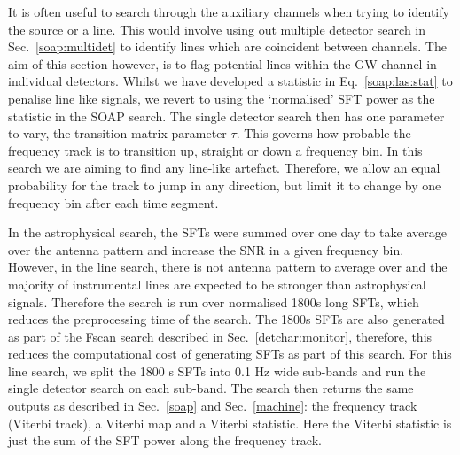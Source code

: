 It is often useful to search through the auxiliary channels when trying to
identify the source or a line. 
This would involve using out multiple detector search in Sec.~\ref{soap:multidet} to identify lines which are coincident between channels. 
The aim of this section however, is to flag potential lines within the \gls{GW} channel in individual detectors.
Whilst we have developed a statistic in Eq.~\ref{soap:las:stat} to penalise line like signals, we revert to using the
`normalised' \gls{SFT} power as the statistic in the SOAP search. The single
detector search then has one parameter to vary, the transition matrix
parameter $\tau$.  This governs how probable the frequency track is to transition up,
straight or down a frequency bin.  In this search we are aiming to find any line-like artefact.
Therefore, we allow an equal probability for the track to jump in any
direction, but limit it to change by one frequency bin after each time
segment.  

In the astrophysical search, the \glspl{SFT} were summed over one day to take average over the antenna pattern and increase the \gls{SNR} in a given frequency bin.
However, in the line search, there is not antenna pattern to average over and the majority of instrumental lines are expected to be stronger than astrophysical signals.
Therefore the search is run over normalised 1800s long \glspl{SFT}, which reduces the preprocessing time of the search.
The 1800s \glspl{SFT} are also generated as part of the Fscan search described in Sec.~\ref{detchar:monitor}, therefore, this reduces the computational cost of generating \glspl{SFT} as part of this search. 
For this line search, we split the 1800 s \glspl{SFT} into 0.1 Hz wide sub-bands and run the single detector search on each sub-band. 
The search then returns the same outputs as described in
Sec.~\ref{soap} and Sec.~\ref{machine}: the frequency track (Viterbi track), a
Viterbi map and a Viterbi statistic.  Here the Viterbi statistic is just the
sum of the \gls{SFT} power along the frequency track.  

